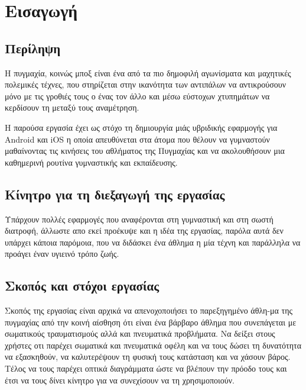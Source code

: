 \documentclass[a4paper,12pt]{article}
\begin{document}
	\newpage	
	\tableofcontents
	\listoffigures
	\listoftables

	\newpage
	\section{Εισαγωγή}

		\subsection{Περίληψη}

			Η πυγμαχία, κοινώς μποξ είναι ένα από τα πιο δημοφιλή αγωνίσματα και μαχητικές πολεμικές τέχνες, που στηρίζεται στην ικανότητα των αντιπάλων 
			να αντικρούσουν μόνο με τις γροθιές τους ο ένας τον άλλο και μέσω εύστοχων χτυπημάτων να κερδίσουν τη μεταξύ τους αναμέτρηση.

			Η παρούσα εργασία έχει ως στόχο τη δημιουργία μιάς υβριδικής εφαρμογής για Android 
			και iOS η οποία απευθύνεται στα άτομα που θέλουν να γυμναστούν μαθαίνοντας τις κινήσεις του αθλήματος της Πυγμαχίας και να ακολουθήσουν 
			μια καθημερινή ρουτίνα γυμναστικής και εκπαίδευσης.

		\subsection{Κίνητρο για τη διεξαγωγή της εργασίας}	

			Υπάρχουν πολλές εφαρμογές που αναφέρονται στη γυμναστική και στη σωστή διατροφή, άλλωστε απο εκεί προέκυψε και η ιδέα της εργασίας, 
			παρόλα αυτά δεν υπάρχει κάποια παρόμοια, που να διδάσκει ένα άθλημα η μία τέχνη και παράλληλα να προάγει έναν υγιεινό τρόπο ζωής. 


		\subsection{Σκοπός και στόχοι εργασίας}	
			
			Σκοπός της εργασίας είναι αρχικά να απενοχοποιήσει το παρεξηγημένο 
			άθλη-μα της πυγμαχίας από την κοινή αίσθηση ότι είναι ένα βάρβαρο άθλημα 
			που συνεπάγεται με σωματικούς τραυματισμούς αλλά και πνευματικά προβλήματα.
			Να δείξει στους χρήστες οτι παρέχει σωματικά και πνευματικά οφέλη και 
			να τους δώσει τη δυνατότητα να εξασκηθούν, να καλυτερέψουν τη φυσική τους κατάσταση 
			και να χάσουν βάρος. Τέλος να τους παρέχει οπτικά διαγράμματα ώστε να βλέπουν την πρόοδο τους και έτσι να τους δίνει κίνητρο για να συνεχίσουν
			να τη χρησιμοποιούν.   
\end{document}
